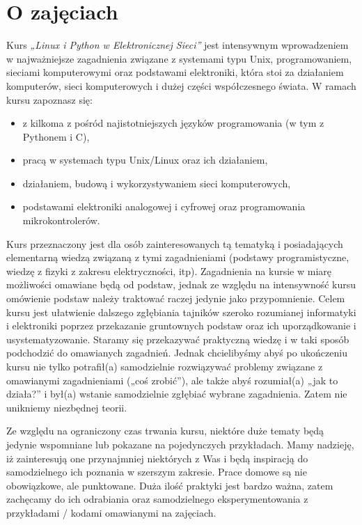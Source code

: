 \section{O zajęciach}

Kurs \textit{„Linux i Python w Elektronicznej Sieci”} jest intensywnym wprowadzeniem w najważniejsze zagadnienia związane z systemami typu Unix, programowaniem, sieciami komputerowymi oraz podstawami elektroniki, która stoi za działaniem komputerów, sieci komputerowych i dużej części współczesnego świata. W ramach kursu zapoznasz się:
\begin{itemize}
	\item z kilkoma z pośród najistotniejszych języków programowania (w tym z Pythonem i C),
	\item pracą w systemach typu Unix/Linux oraz ich działaniem,
	\item działaniem, budową i wykorzystywaniem sieci komputerowych,
	\item podstawami elektroniki analogowej i cyfrowej oraz programowania mikrokontrolerów.
\end{itemize}
Kurs przeznaczony jest dla osób zainteresowanych tą tematyką i posiadających elementarną wiedzą związaną z tymi zagadnieniami (podstawy programistyczne, wiedzę z fizyki z zakresu elektryczności, itp).
Zagadnienia na kursie w miarę możliwości omawiane będą od podstaw, jednak ze względu na intensywność kursu omówienie podstaw należy traktować raczej jedynie jako przypomnienie.
Celem kursu jest ułatwienie dalszego zgłębiania tajników szeroko rozumianej informatyki i elektroniki poprzez przekazanie gruntownych podstaw oraz ich uporządkowanie i usystematyzowanie.
Staramy się przekazywać praktyczną wiedzę i w taki sposób podchodzić do omawianych zagadnień.
Jednak chcielibyśmy abyś po ukończeniu kursu nie tylko potrafił(a) samodzielnie rozwiązywać problemy związane z omawianymi zagadnieniami („coś zrobić”),
ale także abyś rozumiał(a) „jak to działa?” i był(a) wstanie samodzielnie zgłębiać wybrane zagadnienia. Zatem nie unikniemy niezbędnej teorii.

Ze względu na ograniczony czas trwania kursu, niektóre duże tematy będą jedynie wspomniane lub pokazane na pojedynczych przykładach.
Mamy nadzieję, iż zainteresują one przynajmniej niektórych z Was i będą inspiracją do samodzielnego ich poznania w szerszym zakresie.
Prace domowe są nie obowiązkowe, ale punktowane.
Duża ilość praktyki jest bardzo ważna, zatem zachęcamy do ich odrabiania oraz samodzielnego eksperymentowania z przykładami / kodami omawianymi na zajęciach.

